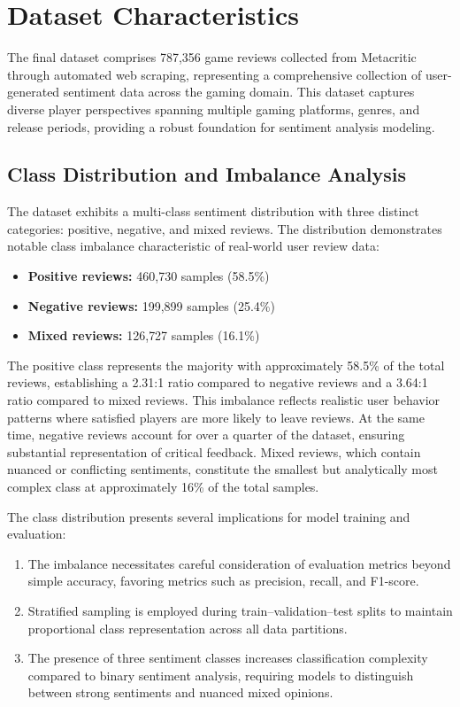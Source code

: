\section{Dataset Characteristics}

The final dataset comprises 787{,}356 game reviews collected from Metacritic through automated web scraping, representing a comprehensive collection of user-generated sentiment data across the gaming domain. This dataset captures diverse player perspectives spanning multiple gaming platforms, genres, and release periods, providing a robust foundation for sentiment analysis modeling.

\subsection{Class Distribution and Imbalance Analysis}

The dataset exhibits a multi-class sentiment distribution with three distinct categories: positive, negative, and mixed reviews. The distribution demonstrates notable class imbalance characteristic of real-world user review data:

\begin{itemize}
    \item \textbf{Positive reviews:} 460{,}730 samples (58.5\%)
    \item \textbf{Negative reviews:} 199{,}899 samples (25.4\%)
    \item \textbf{Mixed reviews:} 126{,}727 samples (16.1\%)
\end{itemize}

The positive class represents the majority with approximately 58.5\% of the total reviews, establishing a 2.31:1 ratio compared to negative reviews and a 3.64:1 ratio compared to mixed reviews. This imbalance reflects realistic user behavior patterns where satisfied players are more likely to leave reviews. At the same time, negative reviews account for over a quarter of the dataset, ensuring substantial representation of critical feedback. Mixed reviews, which contain nuanced or conflicting sentiments, constitute the smallest but analytically most complex class at approximately 16\% of the total samples.

The class distribution presents several implications for model training and evaluation:

\begin{enumerate}
    \item The imbalance necessitates careful consideration of evaluation metrics beyond simple accuracy, favoring metrics such as precision, recall, and F1-score.
    \item Stratified sampling is employed during train--validation--test splits to maintain proportional class representation across all data partitions.
    \item The presence of three sentiment classes increases classification complexity compared to binary sentiment analysis, requiring models to distinguish between strong sentiments and nuanced mixed opinions.
\end{enumerate}

